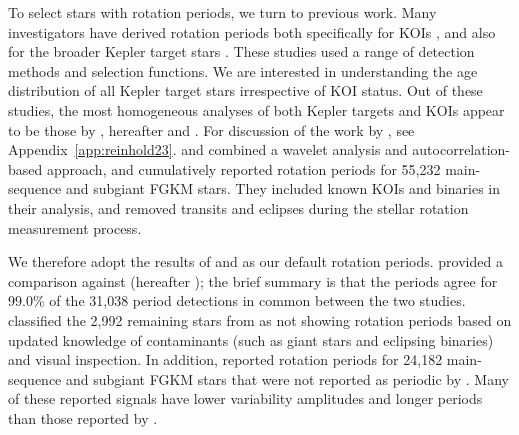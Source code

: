 \documentclass[11pt,twocolumn,tighten]{aastex63}
\begin{document}
To select stars with rotation periods, we turn to previous work.  Many
investigators have derived rotation periods both specifically for KOIs
\citep{McQuillan_2013,Walkowicz_2013,Mazeh_2015,Angus_2018,David_2021},
and also for the broader  Kepler target stars
\citep{McQuillan_2014,Reinhold_2015,Santos_2019,Santos_2021,Reinhold2023}.
These studies used a range of detection methods and selection
functions.  We are interested in understanding the age distribution of
all Kepler target stars irrespective of KOI status.  Out of these
studies, the most homogeneous analyses of both Kepler
targets and KOIs appear to be those by
\citet{Santos_2019,Santos_2021}, hereafter 
and .  For discussion of the work by
\citet{Reinhold2023}, see Appendix~\ref{app:reinhold23}.
 and  combined a
wavelet analysis and autocorrelation-based approach, and cumulatively
reported rotation periods for 55{,}232 main-sequence and subgiant FGKM
stars.  They included known KOIs and binaries in their analysis, and
removed transits and eclipses during the stellar rotation measurement
process. 

We therefore adopt the results of  and
 as our default rotation periods.
 provided a comparison against
\citet{McQuillan_2014} (hereafter ); the brief summary is that the periods
agree for 99.0\% of the 31{,}038 period detections in common between
the two studies.   classified the 2{,}992
remaining stars from  as not showing
rotation periods based on updated knowledge of contaminants
(such as giant stars and eclipsing binaries) and visual inspection.  In
addition,  reported rotation periods for
24{,}182 main-sequence and subgiant FGKM stars that were not reported
as periodic by .  Many of these reported
signals have lower variability amplitudes and longer periods than
those reported by . 
\end{document}
